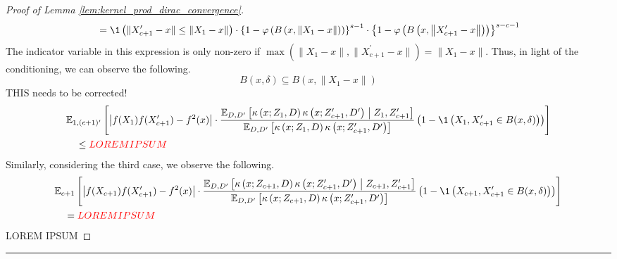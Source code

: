 \begin{proof}[Proof of Lemma \ref{lem:kernel_prod_dirac_convergence}]
\begin{equation}
\begin{aligned}
            & \quad = \1\left(\|X_{c+1}^{\prime} - x\| \leq \|X_{1} - x\|\right)
            \cdot \left\{1-\varphi\left(B\left(x,\left\|X_1-x\right\|\right)\right)\right\}^{s-1}
            \cdot \left\{1-\varphi\left(B\left(x,\left\|X_{c+1}^{\prime}-x\right\|\right)\right)\right\}^{s-c-1}
        \end{aligned}
    \end{equation}
    The indicator variable in this expression is only non-zero if $\max\left(\|X_{1} - x\|, \|X_{c+1}^{\prime} - x\|\right) = \|X_{1} - x\|$.
    Thus, in light of the conditioning, we can observe the following.
    \begin{equation}
        B(x, \delta) \subseteq B(x, \|X_{1} - x\|)
    \end{equation}
    {\color{red} THIS needs to be corrected!}
    \begin{equation}
        \begin{aligned}
            & \E_{1, (c+1)^{\prime}}\left[
                \left| f(X_{1}) f(X_{c+1}^{\prime}) - f^{2}(x)\right|
                \cdot \frac{\E_{D, D^{\prime}}\left[\kappa\left(x; Z_{1}, D\right)\kappa\left(x; Z_{c+1}^{\prime}, D^{\prime}\right) \; \middle| \; Z_{1}, Z_{c+1}^{\prime}\right]}{\E_{D, D^{\prime}}\left[\kappa\left(x; Z_{1}, D\right)\kappa\left(x; Z_{c+1}^{\prime}, D^{\prime}\right)\right]}
                \left(1 - \1\left(X_1, X_{c+1}^{\prime} \in B(x, \delta)\right)\right)
            \right]\\
            & \quad \leq {\color{red} LOREM IPSUM}
        \end{aligned}
    \end{equation}
    Similarly, considering the third case, we observe the following.
    \begin{equation}
        \begin{aligned}
            & \E_{c+1}\left[
                \left|f(X_{c+1}) f(X_{c+1}^{\prime}) - f^{2}(x)\right|
                \cdot \frac{\E_{D, D^{\prime}}\left[\kappa\left(x; Z_{c+1}, D\right)\kappa\left(x; Z_{c+1}^{\prime}, D^{\prime}\right) \; \middle| \; Z_{c+1}, Z_{c+1}^{\prime}\right]}{\E_{D, D^{\prime}}\left[\kappa\left(x; Z_{c+1}, D\right)\kappa\left(x; Z_{c+1}^{\prime}, D^{\prime}\right)\right]} 
                \left(1 - \1\left(X_{c+1}, X_{c+1}^{\prime} \in B(x, \delta)\right)\right)
            \right]\\
            & \quad = {\color{red} LOREM IPSUM}
        \end{aligned}
    \end{equation}
    {\color{red} LOREM IPSUM}
\end{proof}

\hrule
